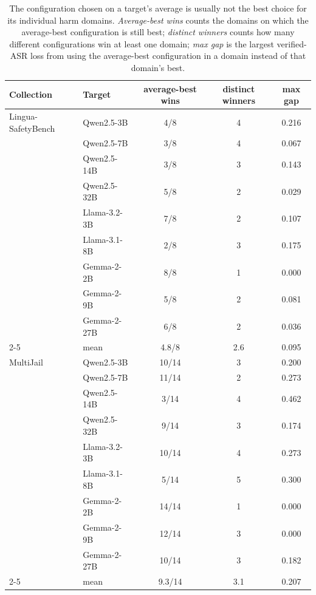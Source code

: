\begin{table}[t]
\centering
\small
\caption{The configuration chosen on a target's average is usually not the best choice for its individual harm domains. \emph{Average-best wins} counts the domains on which the average-best configuration is still best; \emph{distinct winners} counts how many different configurations win at least one domain; \emph{max gap} is the largest verified-ASR loss from using the average-best configuration in a domain instead of that domain's best.}
\label{tab:sel_domain}
\begin{tabular}{llccc}
\toprule
Collection & Target & average-best wins & distinct winners & max gap \\
\midrule
Lingua-SafetyBench & Qwen2.5-3B & 4/8 & 4 & 0.216 \\
 & Qwen2.5-7B & 3/8 & 4 & 0.067 \\
 & Qwen2.5-14B & 3/8 & 3 & 0.143 \\
 & Qwen2.5-32B & 5/8 & 2 & 0.029 \\
 & Llama-3.2-3B & 7/8 & 2 & 0.107 \\
 & Llama-3.1-8B & 2/8 & 3 & 0.175 \\
 & Gemma-2-2B & 8/8 & 1 & 0.000 \\
 & Gemma-2-9B & 5/8 & 2 & 0.081 \\
 & Gemma-2-27B & 6/8 & 2 & 0.036 \\
\cmidrule(lr){2-5}
 & mean & 4.8/8 & 2.6 & 0.095 \\
MultiJail & Qwen2.5-3B & 10/14 & 3 & 0.200 \\
 & Qwen2.5-7B & 11/14 & 2 & 0.273 \\
 & Qwen2.5-14B & 3/14 & 4 & 0.462 \\
 & Qwen2.5-32B & 9/14 & 3 & 0.174 \\
 & Llama-3.2-3B & 10/14 & 4 & 0.273 \\
 & Llama-3.1-8B & 5/14 & 5 & 0.300 \\
 & Gemma-2-2B & 14/14 & 1 & 0.000 \\
 & Gemma-2-9B & 12/14 & 3 & 0.000 \\
 & Gemma-2-27B & 10/14 & 3 & 0.182 \\
\cmidrule(lr){2-5}
 & mean & 9.3/14 & 3.1 & 0.207 \\
\bottomrule
\end{tabular}
\end{table}
